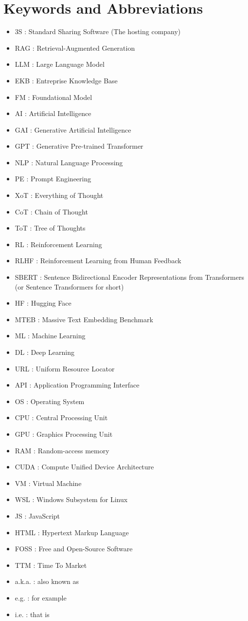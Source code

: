 \chapter*{Keywords and Abbreviations}
\begin{itemize}
    \item 3S : Standard Sharing Software (The hosting company)
    \item RAG : Retrieval-Augmented Generation
    \item LLM : Large Language Model
    \item EKB : Entreprise Knowledge Base
    \item FM : Foundational Model
    \item AI : Artificial Intelligence
    \item GAI : Generative Artificial Intelligence
    \item GPT : Generative Pre-trained Transformer
    \item NLP : Natural Language Processing
    \item PE : Prompt Engineering
    \item XoT : Everything of Thought
    \item CoT : Chain of Thought
    \item ToT : Tree of Thoughts
    \item RL : Reinforcement Learning
    \item RLHF : Reinforcement Learning from Human Feedback
    \item SBERT : Sentence Bidirectional Encoder Representations from Transformers (or Sentence Transformers for short)
    \item HF : Hugging Face
    \item MTEB : Massive Text Embedding Benchmark
    \item ML : Machine Learning
    \item DL : Deep Learning
    \item URL : Uniform Resource Locator
    \item API : Application Programming Interface
    \item OS : Operating System
    \item CPU : Central Processing Unit
    \item GPU : Graphics Processing Unit
    \item RAM : Random-access memory
    \item CUDA : Compute Unified Device Architecture
    \item VM : Virtual Machine
    \item WSL : Windows Subsystem for Linux
    \item JS : JavaScript
    \item HTML : Hypertext Markup Language
    \item FOSS : Free and Open-Source Software
    \item TTM : Time To Market
    \item a.k.a. : also known as
    \item e.g. : for example
    \item i.e. : that is
\end{itemize}